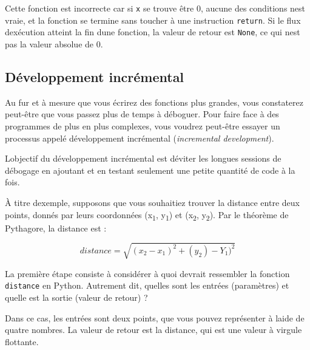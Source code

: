 Cette fonction est incorrecte car si \texttt{x} se trouve être 0, aucune
des conditions n\textquotesingle est vraie, et la fonction se termine
sans toucher à une instruction \texttt{return}. Si le flux
d\textquotesingle exécution atteint la fin d\textquotesingle une
fonction, la valeur de retour est \texttt{None}, ce qui
n\textquotesingle est pas la valeur absolue de 0.

\begin{Shaded}
\begin{Highlighting}[]
\OperatorTok{\textgreater{}\textgreater{}\textgreater{}} \NormalTok{))}
\end{Highlighting}
\end{Shaded}

\hypertarget{duxe9veloppement-incruxe9mental}{%
\subsection{Développement
incrémental}\label{duxe9veloppement-incruxe9mental}}

Au fur et à mesure que vous écrirez des fonctions plus grandes, vous
constaterez peut-être que vous passez plus de temps à déboguer. Pour
faire face à des programmes de plus en plus complexes, vous voudrez
peut-être essayer un processus appelé développement incrémental
(\emph{incremental development}).

L\textquotesingle objectif du développement incrémental est
d\textquotesingle éviter les longues sessions de débogage en ajoutant et
en testant seulement une petite quantité de code à la fois.

À titre d\textquotesingle exemple, supposons que vous souhaitiez trouver
la distance entre deux points, donnés par leurs coordonnées
(x\textsubscript{1}, y\textsubscript{1}) et (x\textsubscript{2},
y\textsubscript{2}). Par le théorème de Pythagore, la distance est :

\[distance = \sqrt{(x_2 - x_1)^2 + (y_2) - Y_1)^2}\]

La première étape consiste à considérer à quoi devrait ressembler la
fonction \texttt{distance} en Python. Autrement dit, quelles sont les
entrées (paramètres) et quelle est la sortie (valeur de retour) ?

Dans ce cas, les entrées sont deux points, que vous pouvez représenter à
l\textquotesingle aide de quatre nombres. La valeur de retour est la
distance, qui est une valeur à virgule flottante.

